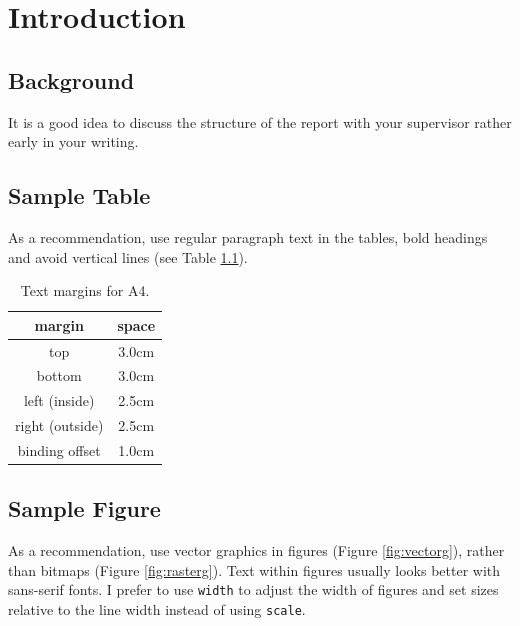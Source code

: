 \chapter[Introduction]{Introduction}\label{chap-intro}

\section{Background}

It is a good idea to discuss the structure of the report with your supervisor rather early in your writing.

\section{Sample Table}

As a recommendation, use regular paragraph text in the tables, bold headings and avoid vertical lines (see Table \ref{tab:margins}). 

\begin{table}
\centering
\caption{Text margins for A4.}\label{tab:margins}
\begin{tabular}{cc}
\hline
\textbf{margin} & \textbf{space} \\
\hline 
top &  3.0cm\\ 
bottom & 3.0cm \\ 
left (inside) & 2.5cm \\ 
right (outside) & 2.5cm \\ 
binding offset & 1.0cm \\ 
\hline 
\end{tabular} 
\end{table}

\section{Sample Figure}

As a recommendation, use vector graphics in figures (Figure \ref{fig:vectorg}), rather than bitmaps (Figure \ref{fig:rasterg}). Text within figures usually looks better with sans-serif fonts.  I prefer to use \texttt{width} to adjust the width of figures and set sizes relative to the line width instead of using \texttt{scale}.

